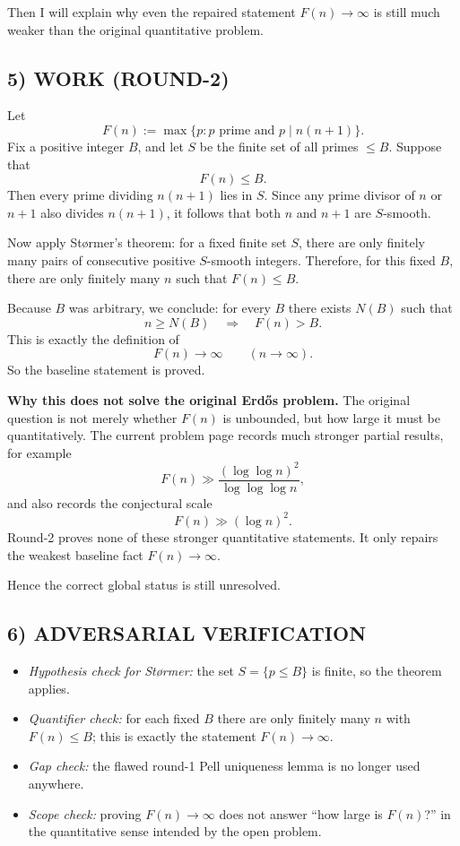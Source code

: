 Then I will explain why even the repaired statement $F(n)\to\infty$ is still much weaker than the original quantitative problem.

\subsection*{5) WORK (ROUND-2)}
Let
\[
F(n):=\max\{p : p\mbox{ prime and } p\mid n(n+1)\}.
\]
Fix a positive integer $B$, and let $S$ be the finite set of all primes $\le B$.
Suppose that
\[
F(n)\le B.
\]
Then every prime dividing $n(n+1)$ lies in $S$. Since any prime divisor of $n$ or $n+1$ also divides $n(n+1)$, it follows that both $n$ and $n+1$ are $S$-smooth.

Now apply St\o rmer's theorem: for a fixed finite set $S$, there are only finitely many pairs of consecutive positive $S$-smooth integers. Therefore, for this fixed $B$, there are only finitely many $n$ such that $F(n)\le B$.

Because $B$ was arbitrary, we conclude:
for every $B$ there exists $N(B)$ such that
\[
n\ge N(B)\quad\Longrightarrow\quad F(n)>B.
\]
This is exactly the definition of
\[
F(n)\to\infty\qquad (n\to\infty).
\]
So the baseline statement is proved.

\medskip
\textbf{Why this does not solve the original Erd\H{o}s problem.}
The original question is not merely whether $F(n)$ is unbounded, but how large it must be quantitatively. The current problem page records much stronger partial results, for example
\[
F(n)\gg \frac{(\log\log n)^2}{\log\log\log n},
\]
and also records the conjectural scale
\[
F(n)\gg (\log n)^2.
\]
Round-2 proves none of these stronger quantitative statements. It only repairs the weakest baseline fact $F(n)\to\infty$.

Hence the correct global status is still unresolved.

\subsection*{6) ADVERSARIAL VERIFICATION}
\begin{itemize}
\item \emph{Hypothesis check for St\o rmer:} the set $S=\{p\le B\}$ is finite, so the theorem applies.
\item \emph{Quantifier check:} for each fixed $B$ there are only finitely many $n$ with $F(n)\le B$; this is exactly the statement $F(n)\to\infty$.
\item \emph{Gap check:} the flawed round-1 Pell uniqueness lemma is no longer used anywhere.
\item \emph{Scope check:} proving $F(n)\to\infty$ does not answer ``how large is $F(n)$?'' in the quantitative sense intended by the open problem.
\end{itemize}

